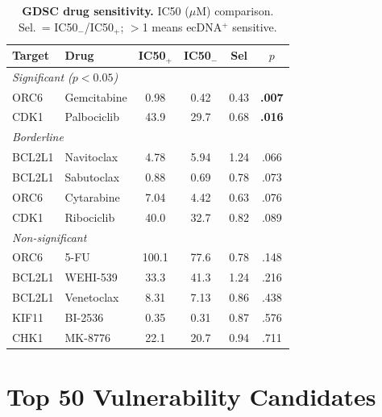\documentclass[sigconf,anonymous]{acmart}
\begin{document}
\begin{table}[h]
\caption{\textbf{GDSC drug sensitivity.} IC50 ($\mu$M) comparison. Sel.\ = IC50$_-$/IC50$_+$; $>$1 means ecDNA$^+$ sensitive.}
\label{tab:gdsc_full}
\centering
\footnotesize
\begin{tabular}{@{}llcccc@{}}
\toprule
Target & Drug & IC50$_+$ & IC50$_-$ & Sel & $p$ \\
\midrule
\multicolumn{6}{l}{\textit{Significant ($p < 0.05$)}} \\
ORC6 & Gemcitabine & 0.98 & 0.42 & 0.43 & \textbf{.007} \\
CDK1 & Palbociclib & 43.9 & 29.7 & 0.68 & \textbf{.016} \\
\midrule
\multicolumn{6}{l}{\textit{Borderline}} \\
BCL2L1 & Navitoclax & 4.78 & 5.94 & 1.24 & .066 \\
BCL2L1 & Sabutoclax & 0.88 & 0.69 & 0.78 & .073 \\
ORC6 & Cytarabine & 7.04 & 4.42 & 0.63 & .076 \\
CDK1 & Ribociclib & 40.0 & 32.7 & 0.82 & .089 \\
\midrule
\multicolumn{6}{l}{\textit{Non-significant}} \\
ORC6 & 5-FU & 100.1 & 77.6 & 0.78 & .148 \\
BCL2L1 & WEHI-539 & 33.3 & 41.3 & 1.24 & .216 \\
BCL2L1 & Venetoclax & 8.31 & 7.13 & 0.86 & .438 \\
KIF11 & BI-2536 & 0.35 & 0.31 & 0.87 & .576 \\
CHK1 & MK-8776 & 22.1 & 20.7 & 0.94 & .711 \\
\bottomrule
\end{tabular}
\end{table}


\section{Top 50 Vulnerability Candidates}
\label{app:top_vulnerabilities}
\end{document}
